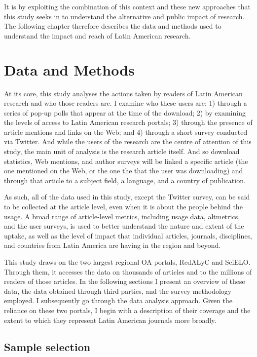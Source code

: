 It is by exploiting the combination of this context and these new approaches that this study seeks in to understand the alternative and public impact of research. The following chapter therefore describes the data and methods used to understand the impact and reach of Latin American research.

\chapter{Data and Methods}
\label{dataandmethods}

At its core, this study analyses the actions taken by readers of Latin American research and who those readers are. I examine who these users are: 1) through a series of pop-up polls that appear at the time of the download; 2) by examining the levels of access to Latin American research portals; 3) through the presence of article mentions and links on the Web; and 4) through a short survey conducted via Twitter. And while the users of the research are the centre of attention of this study, the main unit of analysis is the research article itself. And so download statistics, Web mentions, and author surveys will be linked a specific article (the one mentioned on the Web, or the one the that the user was downloading) and through that article to a subject field, a language, and a country of publication.

As such, all of the data used in this study, except the Twitter survey, can be said to be collected at the article level, even when it is about the people behind the usage. A broad range of article-level metrics, including usage data, altmetrics, and the user surveys, is used to better understand the nature and extent of the uptake, as well as the level of impact that individual articles, journals, disciplines, and countries from Latin America are having in the region and beyond.

This study draws on the two largest regional OA portals, RedALyC and SciELO. Through them, it accesses the data on thousands of articles and to the millions of readers of those articles. In the following sections I present an overview of these data, the data obtained through third parties, and the survey methodology employed. I subsequently go through the data analysis approach. Given the reliance on these two portals, I begin with a description of their coverage and the extent to which they represent Latin American journals more broadly.

\section{Sample selection}
\label{sampleselection}

